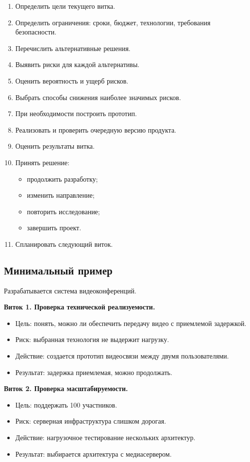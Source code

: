\documentclass[12pt,a4paper]{article}
\begin{document}
\begin{enumerate}
    \item Определить цели текущего витка.
    \item Определить ограничения: сроки, бюджет, технологии, требования безопасности.
    \item Перечислить альтернативные решения.
    \item Выявить риски для каждой альтернативы.
    \item Оценить вероятность и ущерб рисков.
    \item Выбрать способы снижения наиболее значимых рисков.
    \item При необходимости построить прототип.
    \item Реализовать и проверить очередную версию продукта.
    \item Оценить результаты витка.
    \item Принять решение:
    \begin{itemize}
        \item продолжить разработку;
        \item изменить направление;
        \item повторить исследование;
        \item завершить проект.
    \end{itemize}
    \item Спланировать следующий виток.
\end{enumerate}

\subsection{Минимальный пример}

Разрабатывается система видеоконференций.

\textbf{Виток 1. Проверка технической реализуемости.}
\begin{itemize}
    \item Цель: понять, можно ли обеспечить передачу видео с приемлемой задержкой.
    \item Риск: выбранная технология не выдержит нагрузку.
    \item Действие: создается прототип видеосвязи между двумя пользователями.
    \item Результат: задержка приемлемая, можно продолжать.
\end{itemize}

\textbf{Виток 2. Проверка масштабируемости.}
\begin{itemize}
    \item Цель: поддержать 100 участников.
    \item Риск: серверная инфраструктура слишком дорогая.
    \item Действие: нагрузочное тестирование нескольких архитектур.
    \item Результат: выбирается архитектура с медиасервером.
\end{itemize}
\end{document}
